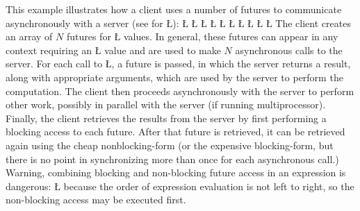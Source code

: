 \documentclass[openright,twoside]{report}
\begin{document}
This example illustrates how a client uses a number of futures to communicate asynchronously with a server (see  for \LGinlinetrue\LGbegin\lgrinde\L{}\endlgrinde\LGend{}):
\LGinlinefalse\LGbegin\lgrinde
\L{}
\CE{}\L{}
\CE{}\L{}
\CE{}\L{\LB{}}
\CE{}\L{\LB{\}}}
\L{}
\CE{}\L{}
\CE{}\L{\LB{}}
\CE{}\L{\LB{}}
\CE{}\L{\LB{\}}}
\endlgrinde\LGend
The client creates an array of $N$ futures for \LGinlinetrue\LGbegin\lgrinde\L{}\endlgrinde\LGend{} values.
In general, these futures can appear in any context requiring an \LGinlinetrue\LGbegin\lgrinde\L{}\endlgrinde\LGend{} value and are used to make $N$ asynchronous calls to the server.
For each call to \LGinlinetrue\LGbegin\lgrinde\L{}\endlgrinde\LGend{}, a future is passed, in which the server returns a result, along with appropriate arguments, which are used by the server to perform the computation.
The client then proceeds asynchronously with the server to perform other work, possibly in parallel with the server (if running multiprocessor).
Finally, the client retrieves the results from the server by first performing a blocking access to each future.
After that future is retrieved, it can be retrieved again using the cheap nonblocking-form (or the expensive blocking-form, but there is no point in synchronizing more than once for each asynchronous call.)
Warning, combining blocking and non-blocking future access in an expression is dangerous:
\LGinlinefalse\LGbegin\lgrinde
\L{}
\endlgrinde\LGend
because the order of expression evaluation is not left to right, so the non-blocking access may be executed first.
\end{document}
